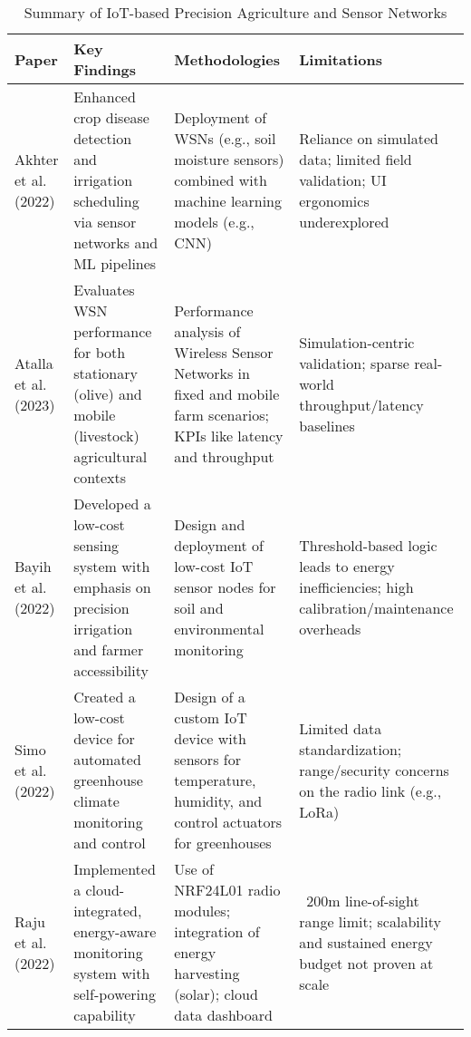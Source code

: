\documentclass[12pt,onecolumn]{IEEEtran} %
\newcommand{\fitToPage}[1]{\begin{adjustbox}{max width=\textwidth}#1\end{adjustbox}}
\renewcommand{\arraystretch}{1.2} %
\begin{document}
\begin{table}[H]
\caption{Summary of IoT-based Precision Agriculture and Sensor Networks}
\label{tab:summary-iot-precision}
\centering
\fitToPage{
\begingroup
\setlength{\tabcolsep}{4pt}
\renewcommand{\arraystretch}{1.15}
\footnotesize
\begin{tabularx}{\textwidth}{@{}P{0.18\textwidth}YYY@{}}
\toprule
\textbf{Paper} & \textbf{Key Findings} & \textbf{Methodologies} & \textbf{Limitations} \\
\midrule
Akhter et al. (2022) & Enhanced crop disease detection and irrigation scheduling via sensor networks and ML pipelines & Deployment of WSNs (e.g., soil moisture sensors) combined with machine learning models (e.g., CNN) & Reliance on simulated data; limited field validation; UI ergonomics underexplored \\
\addlinespace
Atalla et al. (2023) & Evaluates WSN performance for both stationary (olive) and mobile (livestock) agricultural contexts & Performance analysis of Wireless Sensor Networks in fixed and mobile farm scenarios; KPIs like latency and throughput & Simulation-centric validation; sparse real-world throughput/latency baselines \\
\addlinespace
Bayih et al. (2022) & Developed a low-cost sensing system with emphasis on precision irrigation and farmer accessibility & Design and deployment of low-cost IoT sensor nodes for soil and environmental monitoring & Threshold-based logic leads to energy inefficiencies; high calibration/maintenance overheads \\
\addlinespace
Simo et al. (2022) & Created a low-cost device for automated greenhouse climate monitoring and control & Design of a custom IoT device with sensors for temperature, humidity, and control actuators for greenhouses & Limited data standardization; range/security concerns on the radio link (e.g., LoRa) \\
\addlinespace
Raju et al. (2022) & Implemented a cloud-integrated, energy-aware monitoring system with self-powering capability & Use of NRF24L01 radio modules; integration of energy harvesting (solar); cloud data dashboard & ~200m line-of-sight range limit; scalability and sustained energy budget not proven at scale \\
\bottomrule
\end{tabularx}
\endgroup
}
\end{table}
\end{document}

